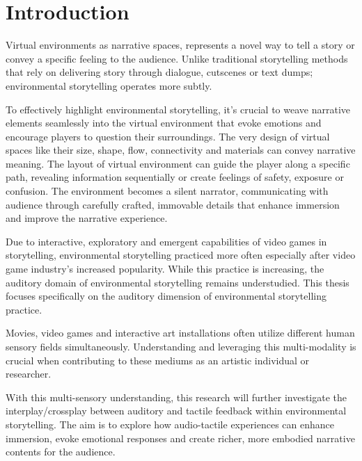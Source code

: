 \chapter{Introduction}
Virtual environments as narrative spaces, represents a novel way to tell a story or convey a specific feeling to the audience. Unlike traditional storytelling methods that rely on delivering story through dialogue, cutscenes or text dumps; environmental storytelling operates more subtly.

To effectively highlight environmental storytelling, it’s crucial to weave narrative elements seamlessly into the virtual environment that evoke emotions and encourage players to question their surroundings. The very design of virtual spaces like their size, shape, flow, connectivity and materials can convey narrative meaning. The layout of virtual environment can guide the player along a specific path, revealing information sequentially or create feelings of safety, exposure or confusion. The environment becomes a silent narrator, communicating with audience through carefully crafted, immovable details that enhance immersion and improve the narrative experience\cite{Environmental_Storytelling_Blogpost}.

Due to interactive, exploratory and emergent capabilities of video games in storytelling, environmental storytelling practiced more often especially after video game industry's increased popularity\cite{Video_Game_Industry_Stat}. While this practice is increasing, the auditory domain of environmental storytelling remains understudied. This thesis focuses specifically on the auditory dimension of environmental storytelling practice.

Movies, video games and interactive art installations often utilize different human sensory fields simultaneously. Understanding and leveraging this multi-modality is crucial when contributing to these mediums as an artistic individual or researcher.

With this multi-sensory understanding, this research will further investigate the interplay/crossplay between auditory and tactile feedback within environmental storytelling. The aim is to explore how audio-tactile experiences can enhance immersion, evoke emotional responses and create richer, more embodied narrative contents for the audience.
